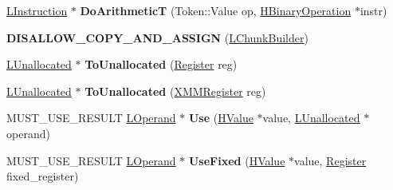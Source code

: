 \begin{DoxyCompactItemize}
\item 
\hyperlink{classv8_1_1internal_1_1_l_instruction}{L\+Instruction} $\ast$ {\bfseries Do\+ArithmeticT} (Token\+::\+Value op, \hyperlink{classv8_1_1internal_1_1_h_binary_operation}{H\+Binary\+Operation} $\ast$instr)\hypertarget{classv8_1_1internal_1_1_l_chunk_builder_aba09d1f1c27b568c058b1d54bb250d12}{}\label{classv8_1_1internal_1_1_l_chunk_builder_aba09d1f1c27b568c058b1d54bb250d12}

\item 
{\bfseries D\+I\+S\+A\+L\+L\+O\+W\+\_\+\+C\+O\+P\+Y\+\_\+\+A\+N\+D\+\_\+\+A\+S\+S\+I\+GN} (\hyperlink{classv8_1_1internal_1_1_l_chunk_builder}{L\+Chunk\+Builder})\hypertarget{classv8_1_1internal_1_1_l_chunk_builder_a19b07322023329077a9f8c29451592b5}{}\label{classv8_1_1internal_1_1_l_chunk_builder_a19b07322023329077a9f8c29451592b5}

\item 
\hyperlink{classv8_1_1internal_1_1_l_unallocated}{L\+Unallocated} $\ast$ {\bfseries To\+Unallocated} (\hyperlink{structv8_1_1internal_1_1_register}{Register} reg)\hypertarget{classv8_1_1internal_1_1_l_chunk_builder_ae996944c8e59f0e19fe2743090135cb9}{}\label{classv8_1_1internal_1_1_l_chunk_builder_ae996944c8e59f0e19fe2743090135cb9}

\item 
\hyperlink{classv8_1_1internal_1_1_l_unallocated}{L\+Unallocated} $\ast$ {\bfseries To\+Unallocated} (\hyperlink{structv8_1_1internal_1_1_double_register}{X\+M\+M\+Register} reg)\hypertarget{classv8_1_1internal_1_1_l_chunk_builder_abc712619ecdd178517e1be85ac32998a}{}\label{classv8_1_1internal_1_1_l_chunk_builder_abc712619ecdd178517e1be85ac32998a}

\item 
M\+U\+S\+T\+\_\+\+U\+S\+E\+\_\+\+R\+E\+S\+U\+LT \hyperlink{classv8_1_1internal_1_1_l_operand}{L\+Operand} $\ast$ {\bfseries Use} (\hyperlink{classv8_1_1internal_1_1_h_value}{H\+Value} $\ast$value, \hyperlink{classv8_1_1internal_1_1_l_unallocated}{L\+Unallocated} $\ast$operand)\hypertarget{classv8_1_1internal_1_1_l_chunk_builder_accd60b3b89817c5ad33a2124e268e793}{}\label{classv8_1_1internal_1_1_l_chunk_builder_accd60b3b89817c5ad33a2124e268e793}

\item 
M\+U\+S\+T\+\_\+\+U\+S\+E\+\_\+\+R\+E\+S\+U\+LT \hyperlink{classv8_1_1internal_1_1_l_operand}{L\+Operand} $\ast$ {\bfseries Use\+Fixed} (\hyperlink{classv8_1_1internal_1_1_h_value}{H\+Value} $\ast$value, \hyperlink{structv8_1_1internal_1_1_register}{Register} fixed\+\_\+register)\hypertarget{classv8_1_1internal_1_1_l_chunk_builder_a61be80f9ab32bd10c228aad8844f63b7}{}\label{classv8_1_1internal_1_1_l_chunk_builder_a61be80f9ab32bd10c228aad8844f63b7}


\end{DoxyCompactItemize}

